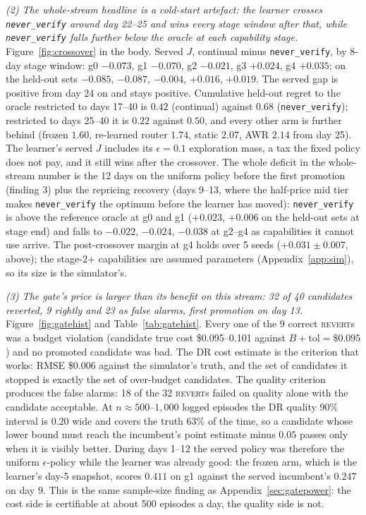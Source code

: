 \documentclass[10pt]{article}
\newcommand{\code}[1]{\texttt{#1}}
\newcommand{\REVERT}{\textsc{revert}}
\begin{document}
\emph{(2) The whole-stream headline is a cold-start artefact: the learner crosses \code{never\_verify} around day 22--25 and wins every stage window after that, while \code{never\_verify} falls further below the oracle at each capability stage.} Figure~\ref{fig:crossover} in the body. Served $J$, continual minus \code{never\_verify}, by 8-day stage window: g0 $-0.073$, g1 $-0.070$, g2 $-0.021$, g3 $+0.024$, g4 $+0.035$; on the held-out sets $-0.085$, $-0.087$, $-0.004$, $+0.016$, $+0.019$. The served gap is positive from day 24 on and stays positive. Cumulative held-out regret to the oracle restricted to days 17--40 is $0.42$ (continual) against $0.68$ (\code{never\_verify}); restricted to days 25--40 it is $0.22$ against $0.50$, and every other arm is further behind (frozen $1.60$, re-learned router $1.74$, static $2.07$, AWR $2.14$ from day 25). The learner's served $J$ includes its $\epsilon=0.1$ exploration mass, a tax the fixed policy does not pay, and it still wins after the crossover. The whole deficit in the whole-stream number is the 12 days on the uniform policy before the first promotion (finding 3) plus the repricing recovery (days 9--13, where the half-price mid tier makes \code{never\_verify} the optimum before the learner has moved): \code{never\_verify} is above the reference oracle at g0 and g1 ($+0.023$, $+0.006$ on the held-out sets at stage end) and falls to $-0.022$, $-0.024$, $-0.038$ at g2--g4 as capabilities it cannot use arrive. The post-crossover margin at g4 holds over 5 seeds ($+0.031\pm0.007$, above); the stage-2+ capabilities are assumed parameters (Appendix~\ref{app:sim}), so its size is the simulator's.

\emph{(3) The gate's price is larger than its benefit on this stream: 32 of 40 candidates reverted, 9 rightly and 23 as false alarms, first promotion on day 13.} Figure~\ref{fig:gatehist} and Table~\ref{tab:gatehist}. Every one of the 9 correct \REVERT{}s was a budget violation (candidate true cost \$0.095--0.101 against $B+\mathrm{tol}=\$0.095$) and no promoted candidate was bad. The DR cost estimate is the criterion that works: RMSE \$0.006 against the simulator's truth, and the set of candidates it stopped is exactly the set of over-budget candidates. The quality criterion produces the false alarms: 18 of the 32 \REVERT{}s failed on quality alone with the candidate acceptable. At $n\approx500$--$1{,}000$ logged episodes the DR quality 90\% interval is $0.20$ wide and covers the truth 63\% of the time, so a candidate whose lower bound must reach the incumbent's point estimate minus $0.05$ passes only when it is visibly better. During days 1--12 the served policy was therefore the uniform $\epsilon$-policy while the learner was already good: the frozen arm, which is the learner's day-5 snapshot, scores $0.411$ on g1 against the served incumbent's $0.247$ on day 9. This is the same sample-size finding as Appendix~\ref{sec:gatepower}: the cost side is certifiable at about 500 episodes a day, the quality side is not.
\end{document}
